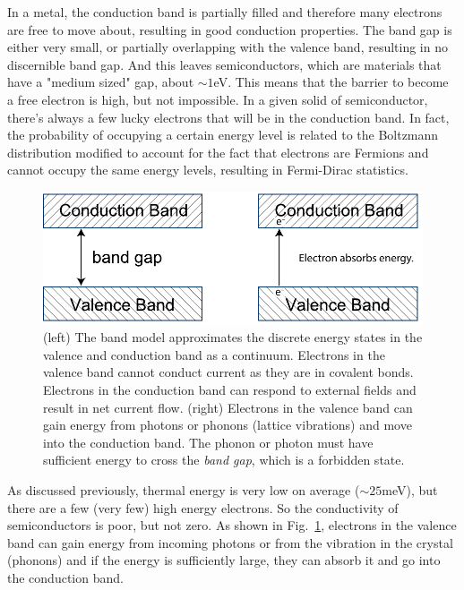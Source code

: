 In a metal, the conduction band is partially filled and therefore many electrons are free to move about, resulting in good conduction properties.  The band gap is either very small, or partially overlapping with the valence band, resulting in no discernible band gap.  And this leaves semiconductors, which are materials that have a "medium sized" gap, about $\sim 1$eV.  This means that the barrier to become a free electron is high, but not impossible.  In a given solid of semiconductor, there's always a few lucky electrons that will be in the conduction band.  In fact, the probability of occupying  a certain energy level is related to the Boltzmann distribution modified to account for the fact that electrons are Fermions and cannot occupy the same energy levels, resulting in Fermi-Dirac statistics.
\begin{figure}
\centering
\includegraphics[width=.65\columnwidth]{energybands.pdf} 
\caption{(left) The band model approximates the discrete energy states in the valence and conduction band as a continuum.  Electrons in the valence band cannot conduct current as they are in covalent bonds.  Electrons in the conduction band can respond to external fields and result in net current flow.  (right)  Electrons in the valence band can gain energy from photons or phonons (lattice vibrations) and move into the conduction band.  The phonon or photon must have sufficient energy to cross the \emph{band gap}, which is a forbidden state.}
\label{fig:slide24b}
\end{figure}
As discussed previously, thermal energy is very low on average ($\sim 25$meV), but there are a few (very few) high energy electrons.   So the conductivity of semiconductors is poor, but not zero.  As shown in Fig.~\ref{fig:slide24b}, electrons in the valence band can gain energy from incoming photons or from the vibration in the crystal (phonons) and if the energy is sufficiently large, they can absorb  it and go into the conduction band.
